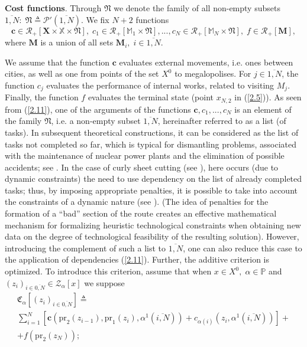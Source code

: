 \documentclass[numbers,sort&compress]{IntechOpen-Book}%
\begin{document}
{\bf Cost functions}.
Through $\mathfrak{N}$
we denote the family of all non-empty subsets
$\overline{1,N}:\;\mathfrak{N} {\triangleq}  \mathcal{P}'(\overline{1,N})$.
We fix $ N + 2 $ functions
\begin{equation}\label{2.11}
  \mathbf{c} \in \mathcal{R}_+[\mathbf{X} \times \mathbb{X} \times \mathfrak{N}],\;
  c_1 \in \mathcal{R}_+[\mathbb{M}_1 \times \mathfrak{N}],...,
  c_N \in \mathcal{R}_+[\mathbb{M}_N \times \mathfrak{N}],\;
  f \in \mathcal{R}_+[\mathbf{M}],
\end{equation}
where $\mathbf{M}$
is a union of all sets
$\mathbf{M}_i,\;i \in \overline{1,N}$.

We assume that the function
$\mathbf{c}$
evaluates external movements,
i.e. ones between cities,
as well as one from points of the set $ X ^ 0 $
to megalopolises.
For $j \in \overline{1,N}$,
the function $ c_j $
evaluates the performance of internal works,
related to visiting $ M_j$.
Finally, the function $ f $
evaluates the terminal state
(point $x_{N,2}$
in (\ref{2.5})).
As seen from (\ref{2.11}),
one of the arguments of the functions
$ \mathbf {c}, c_1, ..., c_N $
is an element of the family $\mathfrak{N}$,
i.e. a non-empty subset $\overline{1, N}$,
hereinafter referred to as a list (of tasks).
In subsequent theoretical constructions,
it can be considered as
the list of tasks
not completed so far,
which is typical for dismantling problems,
associated with the maintenance of nuclear power plants
and the elimination of possible accidents;
see \cite{1,3}.
In the case of curly sheet cutting
(see \cite{4}),
here occurs
(due to dynamic constraints)
the need to use dependency
on the list of already completed tasks;
thus, by imposing appropriate penalties,
it is possible to take into account the constraints of a dynamic nature
(see \cite{18}).
(The idea of penalties
for the formation of a ``bad''
section of the route
creates an effective mathematical mechanism
for formalizing heuristic technological constraints
when obtaining new data on the degree of technological feasibility
of the resulting solution).
However, introducing the complement of such a list to
$\overline{1,N}$,
one can also reduce this case to the application of dependencies
 (\ref{2.11}).
Further, the additive criterion is optimized.
To introduce this criterion, assume that
when
$x \in X^0,\;\alpha \in \mathbb{P}$
and
$(z_i)_{i \in \overline{0,N}} \in \mathcal{Z}_\alpha[x]$
we suppose
\begin{multline}\label{2.12}
\mathfrak{C}_{\alpha}[(z_i)_{i \in \overline{0,N}}] {\triangleq}
\\
\sum\limits_{i=1}^N [\mathbf{c}(\mathrm{pr}_2(z_{i-1}),\mathrm{pr}_1(z_i),\alpha^1(\overline{i,N})) +
c_{\alpha(i)}(z_i,\alpha^1(\overline{i,N}))] +
\\
+ f(\mathrm{pr}_2(z_N));
\end{multline}
\end{document}
